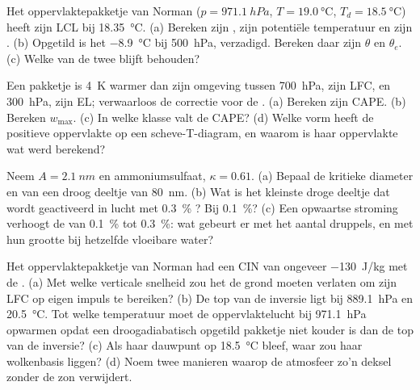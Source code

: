 \begin{exercise}[$\star\star$]\label{exo:b2:atmospheric-thermodynamics:7}
Het oppervlaktepakketje van Norman ($p = \qty{971.1}{hPa}$, $T = \qty{19.0}{\celsius}$, $T_d =
\qty{18.5}{\celsius}$) heeft zijn LCL bij \qty{18.35}{\celsius}. (a) Bereken zijn , zijn
potentiële temperatuur en zijn . (b) Opgetild is het
\qty{-8.9}{\celsius} bij \qty{500}{hPa}, verzadigd. Bereken daar zijn $\theta$ en $\theta_e$.
(c) Welke van de twee blijft behouden?
\end{exercise}

\begin{exercise}[$\star\star$]\label{exo:b2:atmospheric-thermodynamics:8}
Een pakketje is \qty{4}{K} warmer dan zijn omgeving tussen \qty{700}{hPa}, zijn LFC, en
\qty{300}{hPa}, zijn EL; verwaarloos de correctie voor de . (a) Bereken zijn CAPE. (b)
Bereken $w_{\max}$. (c) In welke klasse valt de CAPE? (d) Welke vorm heeft de positieve oppervlakte op een
scheve-T-diagram, en waarom is haar oppervlakte wat werd berekend?
\end{exercise}

\begin{exercise}[$\star\star$]\label{exo:b2:atmospheric-thermodynamics:9}
Neem $A = \qty{2.1}{nm}$ en ammoniumsulfaat, $\kappa = 0.61$. (a) Bepaal de kritieke diameter
en  van een droog deeltje van \qty{80}{nm}. (b) Wat is het kleinste droge deeltje dat
wordt geactiveerd in lucht met \qty{0.3}{\percent} ? Bij \qty{0.1}{\percent}? (c) Een opwaartse stroming
verhoogt de  van \qty{0.1}{\percent} tot \qty{0.3}{\percent}: wat gebeurt er met het
aantal druppels, en met hun grootte bij hetzelfde vloeibare water?
\end{exercise}

\begin{exercise}[$\star\star\star$]\label{exo:b2:atmospheric-thermodynamics:10}
Het oppervlaktepakketje van Norman had een CIN van ongeveer \qty{-130}{J/kg} met de .
(a) Met welke verticale snelheid zou het de grond moeten verlaten om zijn LFC op eigen
impuls te bereiken? (b) De top van de inversie ligt bij \qty{889.1}{hPa} en \qty{20.5}{\celsius}. Tot welke
temperatuur moet de oppervlaktelucht bij \qty{971.1}{hPa} opwarmen opdat een droogadiabatisch
opgetild pakketje niet kouder is dan de top van de inversie? (c) Als haar dauwpunt op
\qty{18.5}{\celsius} bleef, waar zou haar wolkenbasis liggen? (d) Noem twee manieren waarop de atmosfeer
zo'n deksel zonder de zon verwijdert.
\end{exercise}

